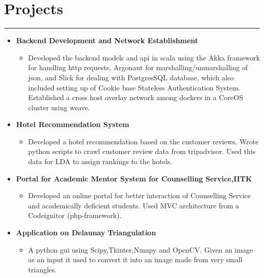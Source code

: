 \documentclass[a4paper]{article}
\begin{document}
\section*{Projects}
\hrule
\vspace{3mm}
  \begin{itemize}
  \item
   \textbf{Backend Development and Network Establishment}
  \begin{itemize}
          \textit{under Prof. Manindra Agarwal}
	   \item Developed the backend models and api in scala using the Akka framework
             for handling http requests, Argonaut for marshalling/unmarshalling of json,
             and Slick for dealing with PostgresSQL database, which also included
             setting up of Cookie base Stateless Authentication System.\\
             Established a cross host overlay network among dockers in a CoreOS 
              cluster using weave.
    \end{itemize}
   \item 
    \textbf{Hotel Recommendation System}
	   \begin{itemize}
	    \item Developed a hotel recommendation based on the customer reviews.
              Wrote python scripts to crawl customer review data from tripadvisor.
              Used this data for LDA to assign rankings to the hotels.
	   \end{itemize}
    \item
    \textbf{Portal for Academic Mentor System for Counselling Service,IITK}
	   \begin{itemize}
	    \item Developed an online portal for better interaction of Counselling 
            Service and academically deficient students. Used MVC architecture 
            from a Codeignitor (php-framework).
	   \end{itemize}
    \item
      \textbf{Application on Delaunay  Triangulation}
	\begin{itemize}
	 \item A python gui using Scipy,Tkinter,Numpy and OpenCV. 
	      Given an image as an input it used to convert it into an image made from very small triangles.
	\end{itemize}
  \end{itemize}

\end{document}

